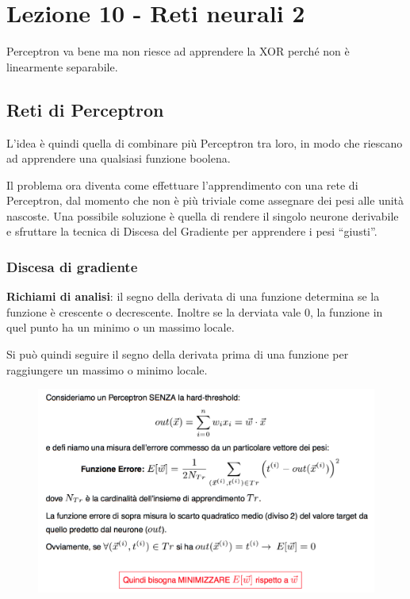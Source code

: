 \section{Lezione 10 - Reti neurali 2}\label{lezione-10---reti-neurali-2}

Perceptron va bene ma non riesce ad apprendere la XOR perché non è
linearmente separabile.

\subsection{Reti di Perceptron}\label{reti-di-perceptron}

L'idea è quindi quella di combinare più Perceptron tra loro, in modo che
riescano ad apprendere una qualsiasi funzione boolena.

Il problema ora diventa come effettuare l'apprendimento con una rete di
Perceptron, dal momento che non è più triviale come assegnare dei pesi
alle unità nascoste. Una possibile soluzione è quella di rendere il
singolo neurone derivabile e sfruttare la tecnica di Discesa del
Gradiente per apprendere i pesi ``giusti''.

\subsubsection{Discesa di gradiente}\label{discesa-di-gradiente}

\textbf{Richiami di analisi}: il segno della derivata di una funzione
determina se la funzione è crescente o decrescente. Inoltre se la
derviata vale 0, la funzione in quel punto ha un minimo o un massimo
locale.

Si può quindi seguire il segno della derivata prima di una funzione per
raggiungere un massimo o minimo locale.

\begin{figure}[htbp]
\centering
\includegraphics{./notes/immagini/l10-threshold.png}
\caption{}
\end{figure}

